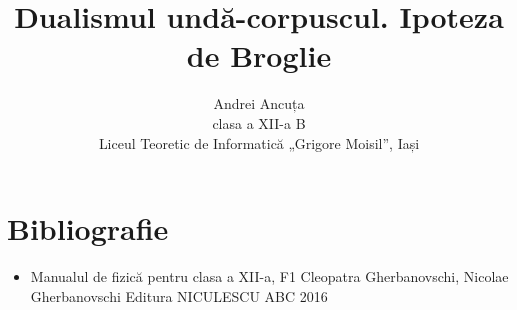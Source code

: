 \documentclass[a4paper, 12pt]{article}
\title{Dualismul undă-corpuscul. Ipoteza de Broglie}
\author{Andrei Ancuța \\ clasa a XII-a B \\
Liceul Teoretic de Informatică „Grigore Moisil”, Iași}
\def\\{}%
\newcommand{\mktitle}{%
    \noindent
    {\small\theauthor}

    \begin{center}
        \LARGE\thetitle
    \end{center}
}
\begin{document}
\mktitle
\tableofcontents




\clearpage

\section*{Bibliografie}
\begin{itemize}
    \item Manualul de fizică pentru clasa a XII-a, F1 \\
        Cleopatra Gherbanovschi, Nicolae Gherbanovschi \\
        Editura NICULESCU ABC \\
        2016
\end{itemize}
\end{document}

